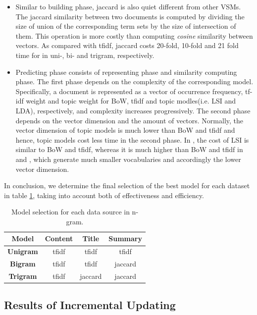 \begin{itemize}
\item Similar to building phase, jaccard is also quiet different from other VSMs. The jaccard similarity between two documents is computed by dividing the size of union of the corresponding term sets by the size of intersection of them. This operation is more costly than computing \textit{cosine} similarity between vectors. As compared with tfidf, jaccard costs 20-fold, 10-fold and 21 fold time for \icontent{} in uni-, bi- and trigram, respectively.

\item Predicting phase consists of representing phase and similarity computing phase. The first phase depends on the complexity of the corresponding model. Specifically, a document is represented as a vector of occurrence frequency, tf-idf weight and topic weight for BoW, tfidf and topic modles(i.e. LSI and LDA), respectively, and complexity increases progressively. The second phase depends on the vector dimension and the amount of vectors. Normally, the vector dimension of topic models is much lower than BoW and tfidf and hence, topic models cost less time in the second phase. In \icontent{}, the cost of LSI is similar to BoW and tfidf, whereas it is much higher than BoW and tfidf in \ititle{} and \isummary{}, which generate much smaller vocabularies and accordingly the lower vector dimension. 

\end{itemize} 

In conclusion, we determine the final selection of the best model for each dataset in table \ref{tab:select}, taking into account both of effectiveness and efficiency.

\begin{table}[!htb]
\centering
\begin{tabular}{|c|c|c|c|}
\hline
\textbf{Model} & \textbf{Content} & \textbf{Title} & \textbf{Summary} \\ \hline
\textbf{Unigram} & tfidf & tfidf & tfidf \\ \hline
\textbf{Bigram} & tfidf & tfidf & jaccard \\ \hline
\textbf{Trigram} & tfidf & jaccard & jaccard \\ \hline
\end{tabular}
\caption{Model selection for each data source in n-gram.}
\label{tab:select}
\end{table}

\subsection{Results of Incremental Updating}
\label{sec:5.4}

